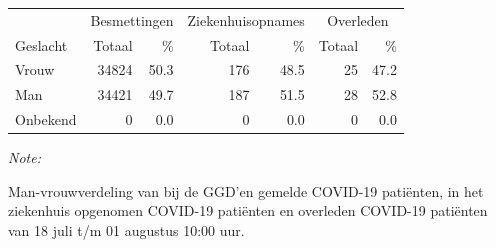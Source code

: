 \documentclass[
  english,
  man,floatsintext]{apa6}
\begin{document}
\begin{table}
\centering\begingroup\fontsize{11}{13}\selectfont

\begin{threeparttable}
\begin{tabular}{lrrrrrr}
\toprule
\multicolumn{1}{c}{ } & \multicolumn{2}{c}{Besmettingen} & \multicolumn{2}{c}{Ziekenhuisopnames} & \multicolumn{2}{c}{Overleden} \\
\cmidrule(l{3pt}r{3pt}){2-3} \cmidrule(l{3pt}r{3pt}){4-5} \cmidrule(l{3pt}r{3pt}){6-7}
Geslacht & Totaal & \% & Totaal & \% & Totaal & \%\\
\midrule
Vrouw & 34824 & 50.3 & 176 & 48.5 & 25 & 47.2\\
Man & 34421 & 49.7 & 187 & 51.5 & 28 & 52.8\\
Onbekend & 0 & 0.0 & 0 & 0.0 & 0 & 0.0\\
\bottomrule
\end{tabular}
\begin{tablenotes}
\item \textit{Note: } 
\item Man-vrouwverdeling van bij de GGD’en gemelde COVID-19 patiënten, in het ziekenhuis opgenomen COVID-19 patiënten en overleden COVID-19 patiënten van 18 juli t/m 01 augustus 10:00 uur.
\end{tablenotes}
\end{threeparttable}
\endgroup{}
\end{table}
\newpage
\end{document}
